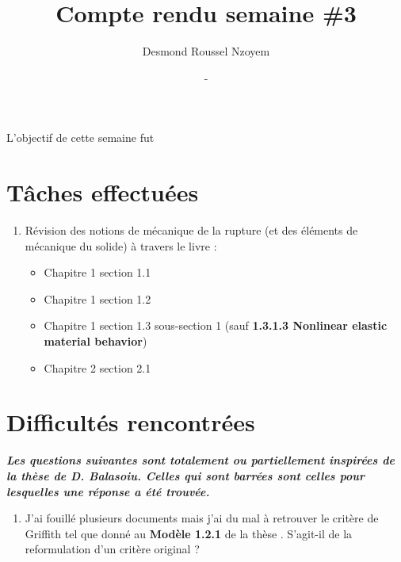 \documentclass[
  french,
	11pt, %
]{fphw}
\title{Compte rendu semaine \#3} %
\author{Desmond Roussel Nzoyem} %
\date{\DTMdisplaydate{2021}{2}{17}{-1} - \DTMdisplaydate{2021}{2}{23}{-1}} %
\institute{Sorbonne Université \\ Laboratoire Jacques-Louis Lions} %
\begin{document}
\maketitle %



L'objectif de cette semaine fut 



\section{Tâches effectuées}

\begin{enumerate}
  \item Révision des notions de mécanique de la rupture (et des éléments de mécanique du solide) à travers le livre \parencite{gross2017fracture} :
  \begin{itemize}
    \item Chapitre 1 section 1.1
    \item Chapitre 1 section 1.2
    \item Chapitre 1 section 1.3 sous-section 1 (sauf \textbf{1.3.1.3 Nonlinear elastic material behavior})
    \item Chapitre 2 section 2.1
  \end{itemize}
\end{enumerate}


\section{Difficultés rencontrées}

\textbf{\textit{Les questions suivantes sont totalement ou partiellement inspirées de la thèse de D. Balasoiu. Celles qui sont barrées sont celles pour lesquelles une réponse a été trouvée.}}
\begin{enumerate}
  \item J'ai fouillé plusieurs documents mais j'ai du mal à retrouver le critère de Griffith tel que donné au \textbf{Modèle 1.2.1} de la thèse \parencite[p.32]{balasoiu2020thesis}. S'agit-il de la reformulation d'un critère original ?
\end{enumerate}
\end{document}
